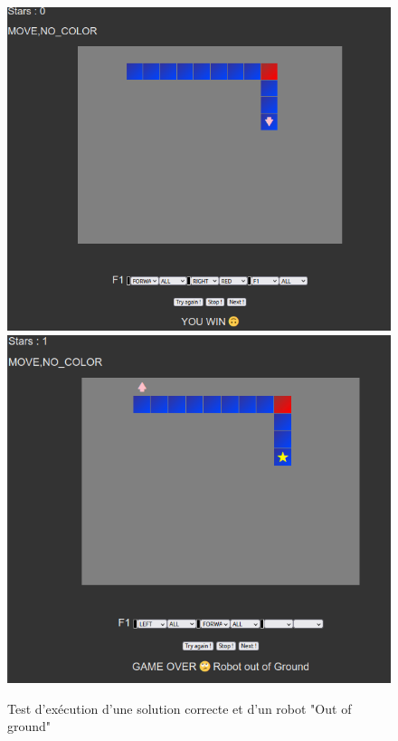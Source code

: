 \documentclass[11pt]{article}
\begin{document}
\begin{figure}[h!]
\begin{center}
\includegraphics[scale=0.3]{html4.png} \quad
\includegraphics[scale=0.3]{html5.png}
\caption{Test d'exécution d'une solution correcte et d'un robot "Out of ground" }
\end{center}
\end{figure}
\end{document}
